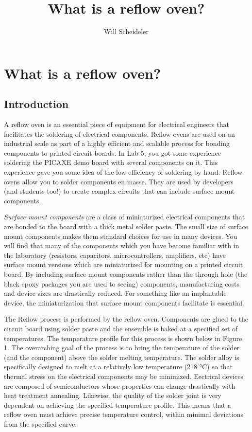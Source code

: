 \documentclass[10pt]{report}
\title{What is a reflow oven?}
\author{Will Scheideler}
\begin{document}
\section*{What is a reflow oven?}

\subsection*{Introduction}

\par A reflow oven is an essential piece of equipment for electrical engineers that facilitates the soldering of electrical components. Reflow ovens are used on an industrial scale as part of a highly efficient and scalable process for bonding components to printed circuit boards. In Lab 5, you got some experience soldering the PICAXE demo board with several components on it. This experience gave you some idea of the low efficiency of soldering by hand. Reflow ovens allow you to solder components en masse.  They are used by developers (and students too!) to create complex circuits that can include surface mount components.

\par \indent \emph{Surface mount components} are a class of miniaturized electrical components that are bonded to the board with a thick metal solder paste. The small size of surface mount components makes them standard choices for use in many devices. You will find that many of the components which you have become familiar with in the laboratory (resistors, capacitors, microcontrollers, amplifiers, etc) have surface mount versions which are miniaturized for mounting on a printed circuit board. By including surface mount components rather than the through hole (the black epoxy packages you are used to seeing) components, manufacturing costs and device sizes are drastically reduced. For something like an implantable device, the miniaturization that surface mount components facilitate is essential.

\par \indent The Reflow process is performed by the reflow oven. Components are glued to the circuit board using solder paste and the ensemble is baked at a specified set of temperatures. The temperature profile for this process is shown below in Figure 1. The overarching goal of the process is to bring the temperature of the solder (and the component) above the solder melting temperature. The solder alloy is specifically designed to melt at a relatively low temperature (218 °C) so that thermal stress on the electrical components may be minimized. Eectrical devices are composed of semiconductors whose properties can change drastically with heat treatment annealing. Likewise, the quality of the solder joint is very dependent on achieving the specified temperature profile. This means that a reflow oven must achieve precise temperature control, within minimal deviations from the specified curve.  
\end{document}
